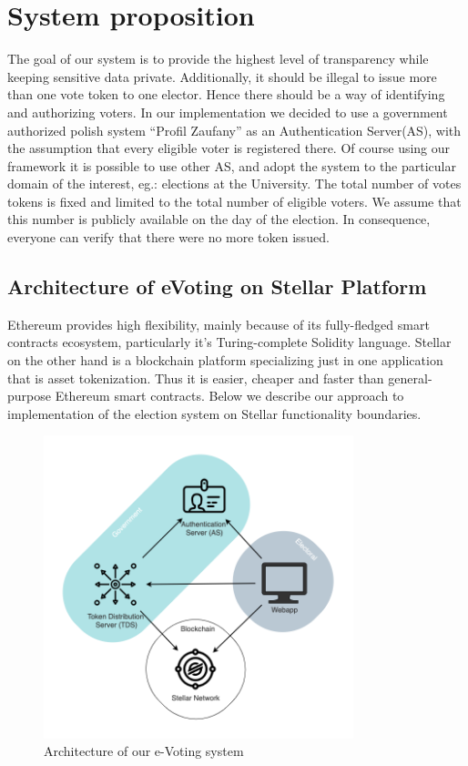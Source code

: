 \documentclass[runningheads]{llncs}
\begin{document}

\section{System proposition}
The goal of our system is to provide the highest level of transparency while keeping sensitive data private. Additionally, it should be illegal to issue more than one vote token to one elector. Hence there should be a way of identifying and authorizing voters. 
In our implementation we decided to use a government authorized polish system
“Profil Zaufany” as an Authentication Server(AS), with the assumption that every eligible voter is registered there. 
Of course using our framework it is possible to use other AS,
and adopt the system to the 
particular domain of the interest, 
eg.: elections at the University.
The total number of votes tokens is fixed and limited to the total number of eligible voters. We assume that this number is publicly available on the day of the election. In consequence, everyone can verify that there were no more token issued. 

\subsection{Architecture of eVoting on Stellar Platform}

Ethereum provides high flexibility, mainly because of its fully-fledged smart contracts ecosystem, particularly it’s Turing-complete Solidity language. 
Stellar on the other hand is a blockchain platform specializing just in one application that is asset tokenization. 
Thus it is easier, cheaper and faster than general-purpose Ethereum smart contracts. 
Below we describe our approach 
to implementation of 
the election system on Stellar functionality boundaries.

\begin{figure}
\includegraphics[width=9cm]{stellot-architecture.png}
\centering
\caption{Architecture of our e-Voting system}
\label{fig:architecture}
\end{figure} 
\iffalse
\end{document}
